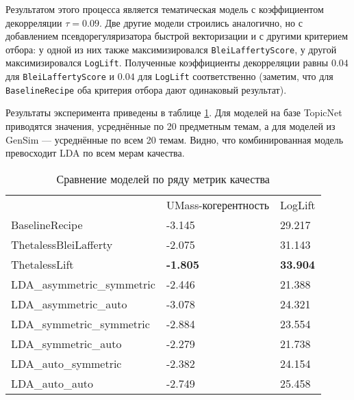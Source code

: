 Результатом этого процесса является тематическая модель с коэффициентом декорреляции $\tau=0.09$. Две другие модели строились аналогично, но с добавлением псевдорегуляризатора быстрой векторизации и с другими критерием отбора: у одной из них также максимизировался \texttt{BleiLaffertyScore}, у другой максимизировался \texttt{LogLift}. Полученные коэффициенты декорреляции равны $0.04$ для \texttt{BleiLaffertyScore} и $0.04$ для \texttt{LogLift} соответственно (заметим, что для \texttt{BaselineRecipe} оба критерия отбора дают одинаковый результат).

Результаты эксперимента приведены в таблице \ref{tab:better_baseline}. Для моделей на базе TopicNet приводятся значения, усреднённые по 20 предметным темам, а для моделей из GenSim --- усреднённые по всем 20 темам. Видно, что комбинированная модель превосходит LDA по всем мерам качества.

\begin{table}[]
\begin{tabular}{lll}
                         & UMass-когерентность & LogLift             \\
BaselineRecipe           & -3.145         & 29.217         \\
ThetalessBleiLafferty   & -2.075         & 31.143           \\
ThetalessLift           & \textbf{-1.805}  & \textbf{33.904} \\
LDA\_asymmetric\_symmetric & -2.446          & 21.388           \\
LDA\_asymmetric\_auto      & -3.078          & 24.321          \\
LDA\_symmetric\_symmetric  & -2.884          & 23.554         \\
LDA\_symmetric\_auto       & -2.279         & 21.738          \\
LDA\_auto\_symmetric       & -2.382           & 24.154          \\
LDA\_auto\_auto            & -2.749          & 25.458        
\end{tabular}
\label{tab:better_baseline}
\caption{Сравнение моделей по ряду метрик качества}
\end{table}





